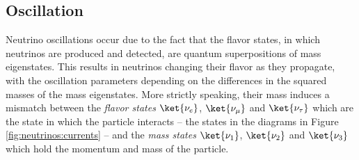 


\subsection{Oscillation}
\label{sec:th:osc}

Neutrino oscillations occur due to the fact that the flavor states, in which neutrinos are produced and detected, are quantum superpositions of mass eigenstates. This results in neutrinos changing their flavor as they propagate, with the oscillation parameters depending on the differences in the squared masses of the mass eigenstates. More strictly speaking, their mass induces a mismatch between the \textit{flavor states} $\ket{\nu_e}$, $\ket{\nu_\mu}$ and $\ket{\nu_\tau}$ which are the state in which the particle interacts -- the states in the diagrams in Figure \ref{fig:neutrinos:currents} -- and the \textit{mass states} $\ket{\nu_1}$, $\ket{\nu_2}$ and $\ket{\nu_3}$ which hold the momentum and mass of the particle.


